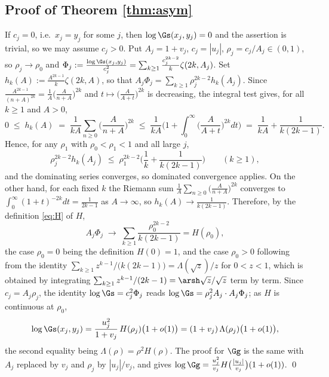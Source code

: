 \subsection{Proof of Theorem \ref{thm:asym}}
If $c_{j}=0$, i.e.\ $x_{j}=y_{j}$ for some $j$, then $\log\Gs(x_{j},y_{j})=0$ and the
assertion is trivial, so we may assume $c_{j}>0$. Put $A_{j}=1+v_{j}$, $c_{j}=|u_{j}|$,
$\rho_{j}=c_{j}/A_{j}\in(0,1)$, so $\rho_{j}\to\rho_{0}$ and
$\Phi_{j}:=\frac{\log\Gs(x_{j},y_{j})}{c_{j}^{2}}
=\sum_{k\ge1}\frac{c_{j}^{2k-2}}{k}\zeta(2k,A_{j})$. Set
$h_{k}(A):=\frac{A^{2k-1}}{k}\zeta(2k,A)$, so that
$A_{j}\Phi_{j}=\sum_{k\ge1}\rho_{j}^{2k-2}h_{k}(A_{j})$. Since
$\frac{A^{2k-1}}{(n+A)^{2k}}=\frac1A\big(\frac{A}{n+A}\big)^{2k}$ and
$t\mapsto\big(\frac{A}{A+t}\big)^{2k}$ is decreasing, the integral test gives, for all
$k\ge1$ and $A>0$,
\begin{equation}\label{eq:EM}
  0\;\le\;h_{k}(A)\;=\;\frac{1}{kA}\sum_{n\ge0}\Big(\frac{A}{n+A}\Big)^{2k}
  \;\le\;\frac{1}{kA}\Big(1+\int_{0}^{\infty}\Big(\frac{A}{A+t}\Big)^{2k}dt\Big)
  \;=\;\frac{1}{kA}+\frac{1}{k(2k-1)} .
\end{equation}
Hence, for any $\rho_{1}$ with $\rho_{0}<\rho_{1}<1$ and all large $j$,
\[
  \rho_{j}^{2k-2}h_{k}(A_{j})\;\le\;\rho_{1}^{2k-2}\Big(\frac{1}{k}+\frac{1}{k(2k-1)}\Big)
  \qquad(k\ge1),
\]
and the dominating series converges, so dominated convergence applies. On the other hand,
for each fixed $k$ the Riemann sum $\frac1A\sum_{n\ge0}\big(\frac{A}{n+A}\big)^{2k}$
converges to $\int_{0}^{\infty}(1+t)^{-2k}dt=\frac{1}{2k-1}$ as $A\to\infty$, so
$h_{k}(A)\to\frac{1}{k(2k-1)}$. Therefore, by the definition \eqref{eq:H} of $H$,
\[
  A_{j}\Phi_{j}\;\longrightarrow\;\sum_{k\ge1}\frac{\rho_{0}^{2k-2}}{k(2k-1)}
   =H(\rho_{0}),
\]
the case $\rho_{0}=0$ being the definition $H(0)=1$, and the case $\rho_{0}>0$ following
from the identity $\sum_{k\ge1}z^{k-1}/\big(k(2k-1)\big)=\Lambda(\sqrt z)/z$ for $0<z<1$,
which is obtained by integrating $\sum_{k\ge1}z^{k-1}/(2k-1)=\arsh\sqrt z/\sqrt z$ term by
term. Since $c_{j}=A_{j}\rho_{j}$, the identity $\log\Gs=c_{j}^{2}\Phi_{j}$ reads
$\log\Gs=\rho_{j}^{2}A_{j}\cdot A_{j}\Phi_{j}$; as $H$ is continuous at $\rho_{0}$,
\[
  \log\Gs(x_{j},y_{j})
   =\frac{u_{j}^{2}}{1+v_{j}}\,H(\rho_{j})\big(1+o(1)\big)
   =(1+v_{j})\,\Lambda(\rho_{j})\big(1+o(1)\big),
\]
the second equality being $\Lambda(\rho)=\rho^{2}H(\rho)$. The proof for $\Gg$ is the same
with $A_{j}$ replaced by $v_{j}$ and $\rho_{j}$ by $|u_{j}|/v_{j}$, and gives
$\log\Gg=\frac{u_{j}^{2}}{v_{j}}H\big(\frac{|u_{j}|}{v_{j}}\big)(1+o(1))$. \qed

